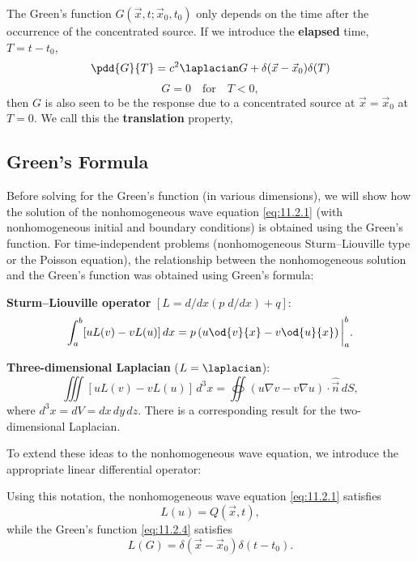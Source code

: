The Green's function $G(\vec{x},t;\vec{x}_0,t_0)$ only depends on the time after the occurrence of the concentrated source.  If we introduce the \textbf{elapsed} time, $T = t - t_0$,
\[
\pdd{G}{T} = c^2 \laplacian G + \delta(\vec{x} - \vec{x}_0)\delta(T)
\]
\[
G = 0 \quad \text{for} \quad T < 0,
\]
then $G$ is also seen to be the response due to a concentrated source at $\vec{x} = \vec{x}_0$ at $T = 0$.  We call this the \textbf{translation} property,

\subsection{Green's Formula}
\label{subsec:greens-formula-wave}

Before solving for the Green's function (in various dimensions), we will show how the solution of the nonhomogeneous wave equation \eqref{eq:11.2.1} (with nonhomogeneous initial and boundary conditions) is obtained using the Green's function.  For time-independent problems (nonhomogeneous Sturm--Liouville type or the Poisson equation), the relationship between the nonhomogeneous solution and the Green's function was obtained using Green's formula:

\textbf{Sturm--Liouville operator} $[L = d/dx(p\;d/dx) + q]$:
\begin{equation}
\label{eq:11.2.7}
\int_a^b [uL(v) - vL(u)]\,dx = p\left(u\od{v}{x} - v\od{u}{x}\right)\bigg|_a^b.
\end{equation}

\textbf{Three-dimensional Laplacian} ($L = \laplacian$):
\begin{equation}
\label{eq:11.2.8}
\iiint [uL(v) - vL(u)]\,d^3x = \oiint (u\nabla v - v\nabla u)\cdot\hat{\vec{n}}\,dS,
\end{equation}
where $d^3 x = dV = dx\,dy\,dz$.  There is a corresponding result for the two-dimensional Laplacian.

To extend these ideas to the nonhomogeneous wave equation, we introduce the appropriate linear differential operator:

Using this notation, the nonhomogeneous wave equation \eqref{eq:11.2.1} satisfies
\begin{equation}
\label{eq:11.2.10}
L(u) = Q(\vec{x},t),
\end{equation}
while the Green's function \eqref{eq:11.2.4} satisfies
\begin{equation}
\label{eq:11.2.11}
L(G) = \delta(\vec{x} - \vec{x}_0)\delta(t - t_0).
\end{equation}

